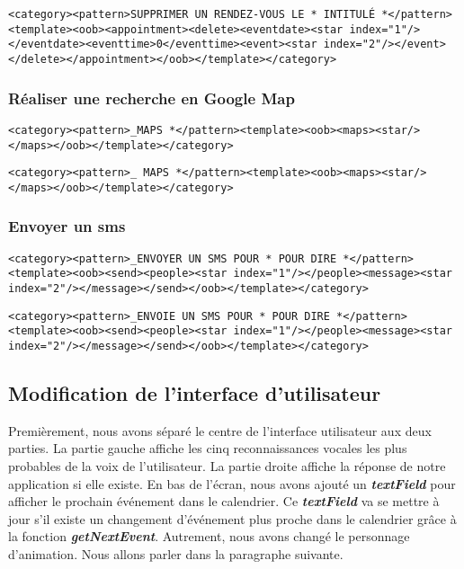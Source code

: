 \begin{lstlisting}[frame=none,aboveskip=0.5em]
<category><pattern>SUPPRIMER UN RENDEZ-VOUS LE * INTITULÉ *</pattern><template><oob><appointment><delete><eventdate><star index="1"/></eventdate><eventtime>0</eventtime><event><star index="2"/></event></delete></appointment></oob></template></category>
\end{lstlisting}

\subsubsection{Réaliser une recherche en Google Map}
\begin{lstlisting}[frame=none,aboveskip=0.5em]
<category><pattern>_MAPS *</pattern><template><oob><maps><star/></maps></oob></template></category>
\end{lstlisting}

\begin{lstlisting}[frame=none,aboveskip=0.5em]
<category><pattern>_ MAPS *</pattern><template><oob><maps><star/></maps></oob></template></category>
\end{lstlisting}

\subsubsection{Envoyer un sms}
\begin{lstlisting}[frame=none,aboveskip=0.5em]
<category><pattern>_ENVOYER UN SMS POUR * POUR DIRE *</pattern><template><oob><send><people><star index="1"/></people><message><star index="2"/></message></send></oob></template></category>
\end{lstlisting}

\begin{lstlisting}[frame=none,aboveskip=0.5em,belowskip=1.5em]
<category><pattern>_ENVOIE UN SMS POUR * POUR DIRE *</pattern><template><oob><send><people><star index="1"/></people><message><star index="2"/></message></send></oob></template></category>
\end{lstlisting}



\subsection{Modification de l'interface d'utilisateur}
\indent Premièrement, nous avons séparé le centre de l'interface utilisateur aux deux parties. La partie gauche affiche les cinq reconnaissances vocales les plus probables de la voix de l'utilisateur. La partie droite affiche la réponse de notre application si elle existe. En bas de l'écran, nous avons ajouté un \textbf{\emph{textField}} pour afficher le prochain événement dans le calendrier. Ce \textbf{\emph{textField}} va se mettre à jour s'il existe un changement d'événement plus proche dans le calendrier grâce à la fonction \textbf{\emph{getNextEvent}}. Autrement, nous avons changé le personnage d'animation. Nous allons parler dans la paragraphe suivante.

